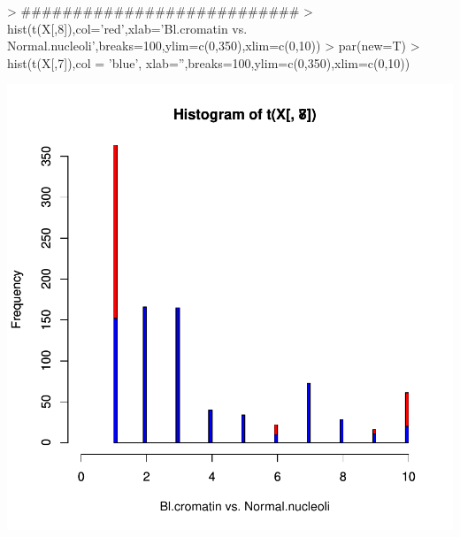 \documentclass{article}
\begin{document}
\begin{Schunk}
\begin{Sinput}
> ###########################
> hist(t(X[,8]),col='red',xlab='Bl.cromatin vs. Normal.nucleoli',breaks=100,ylim=c(0,350),xlim=c(0,10))
> par(new=T)
> hist(t(X[,7]),col = 'blue', xlab='',breaks=100,ylim=c(0,350),xlim=c(0,10))
\end{Sinput}
\end{Schunk}
\includegraphics{selecao-011}
\end{document}
